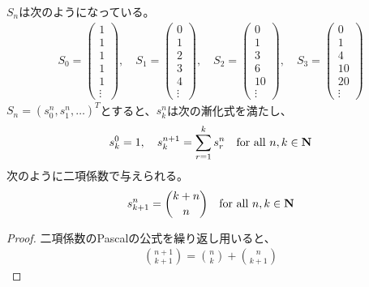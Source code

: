 {	$S_n$は次のようになっている。
	\begin{equation*}\begin{split}
		S_0 = \begin{pmatrix}
			1 \\ 1 \\ 1 \\ 1 \\ 1 \\ \vdots
		\end{pmatrix},\quad S_1 = \begin{pmatrix}
			0 \\ 1 \\ 2 \\ 3 \\ 4 \\ \vdots
		\end{pmatrix},\quad S_2 = \begin{pmatrix}
			0 \\ 1 \\ 3 \\ 6 \\ 10 \\ \vdots
		\end{pmatrix},\quad S_3 = \begin{pmatrix}
			0 \\ 1 \\ 4 \\ 10 \\ 20 \\ \vdots
		\end{pmatrix}
	\end{split}\end{equation*}
	$S_n=(s^n_0,s^n_1,\dots)^T$とすると、$s^n_k$は次の漸化式を満たし、
	\begin{equation*}\begin{split}
		s^0_k = 1,\quad s^{n+1}_k = \sum_{r=1}^k s^n_r
		\quad\text{for all } n,k\in\mathbf{N}
	\end{split}\end{equation*}
	次のように二項係数で与えられる。
	\begin{equation*}\begin{split}
		s^n_{k+1} = \binom{k+n}{n} \quad\text{for all } n,k\in\mathbf{N}
	\end{split}\end{equation*}
	\begin{proof} %
		二項係数のPascalの公式を繰り返し用いると、
		\begin{equation*}\begin{split}
			\binom{n+1}{k+1} = \binom{n}{k} + \binom{n}{k+1}

\end{split}
\end{equation*}
\end{proof}}
